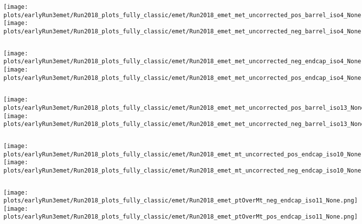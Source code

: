 \documentclass[en,16:9,navbarinfooter]{presentation/sdqbeamer}
\begin{document}
\begin{frame}{\insertsubsection}
   \begin{columns}
   \texttt{[image: plots/earlyRun3emet/Run2018\_plots\_fully\_classic/emet/Run2018\_emet\_met\_uncorrected\_pos\_barrel\_iso4\_None.png]}
   \texttt{[image: plots/earlyRun3emet/Run2018\_plots\_fully\_classic/emet/Run2018\_emet\_met\_uncorrected\_neg\_barrel\_iso4\_None.png]}
\end{columns}
\end{frame}

\begin{frame}{\insertsubsection}
   \begin{columns}
   \texttt{[image: plots/earlyRun3emet/Run2018\_plots\_fully\_classic/emet/Run2018\_emet\_met\_uncorrected\_neg\_endcap\_iso4\_None.png]}
   \texttt{[image: plots/earlyRun3emet/Run2018\_plots\_fully\_classic/emet/Run2018\_emet\_met\_uncorrected\_pos\_endcap\_iso4\_None.png]}
\end{columns}
\end{frame}

\begin{frame}{\insertsubsection}
   \begin{columns}
   \texttt{[image: plots/earlyRun3emet/Run2018\_plots\_fully\_classic/emet/Run2018\_emet\_met\_uncorrected\_pos\_barrel\_iso13\_None.png]}
   \texttt{[image: plots/earlyRun3emet/Run2018\_plots\_fully\_classic/emet/Run2018\_emet\_met\_uncorrected\_neg\_barrel\_iso13\_None.png]}
\end{columns}
\end{frame}

\begin{frame}{\insertsubsection}
   \begin{columns}
   \texttt{[image: plots/earlyRun3emet/Run2018\_plots\_fully\_classic/emet/Run2018\_emet\_mt\_uncorrected\_pos\_endcap\_iso10\_None.png]}
   \texttt{[image: plots/earlyRun3emet/Run2018\_plots\_fully\_classic/emet/Run2018\_emet\_mt\_uncorrected\_neg\_endcap\_iso10\_None.png]}
\end{columns}
\end{frame}

\begin{frame}{\insertsubsection}
   \begin{columns}
   \texttt{[image: plots/earlyRun3emet/Run2018\_plots\_fully\_classic/emet/Run2018\_emet\_ptOverMt\_neg\_endcap\_iso11\_None.png]}
   \texttt{[image: plots/earlyRun3emet/Run2018\_plots\_fully\_classic/emet/Run2018\_emet\_ptOverMt\_pos\_endcap\_iso11\_None.png]}
\end{columns}
\end{frame}
\end{document}
